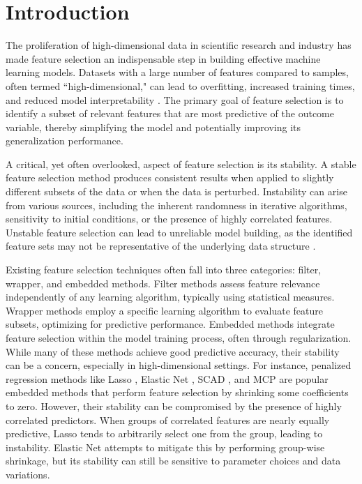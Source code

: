 \documentclass[twoside]{article}
\begin{document}
\section{Introduction}

The proliferation of high-dimensional data in scientific research and industry has made feature selection an indispensable step in building effective machine learning models. Datasets with a large number of features compared to samples, often termed ``high-dimensional," can lead to overfitting, increased training times, and reduced model interpretability \citep{hastie2009elements}. The primary goal of feature selection is to identify a subset of relevant features that are most predictive of the outcome variable, thereby simplifying the model and potentially improving its generalization performance.

A critical, yet often overlooked, aspect of feature selection is its stability. A stable feature selection method produces consistent results when applied to slightly different subsets of the data or when the data is perturbed. Instability can arise from various sources, including the inherent randomness in iterative algorithms, sensitivity to initial conditions, or the presence of highly correlated features. Unstable feature selection can lead to unreliable model building, as the identified feature sets may not be representative of the underlying data structure \citep{meinshausen2010stability}.

Existing feature selection techniques often fall into three categories: filter, wrapper, and embedded methods. Filter methods assess feature relevance independently of any learning algorithm, typically using statistical measures. Wrapper methods employ a specific learning algorithm to evaluate feature subsets, optimizing for predictive performance. Embedded methods integrate feature selection within the model training process, often through regularization. While many of these methods achieve good predictive accuracy, their stability can be a concern, especially in high-dimensional settings. For instance, penalized regression methods like Lasso \citep{Tibshirani1996}, Elastic Net \citep{Zou2005}, SCAD \citep{Fan2001}, and MCP \citep{Zhang2010} are popular embedded methods that perform feature selection by shrinking some coefficients to zero. However, their stability can be compromised by the presence of highly correlated predictors. When groups of correlated features are nearly equally predictive, Lasso tends to arbitrarily select one from the group, leading to instability. Elastic Net attempts to mitigate this by performing group-wise shrinkage, but its stability can still be sensitive to parameter choices and data variations.
\end{document}
